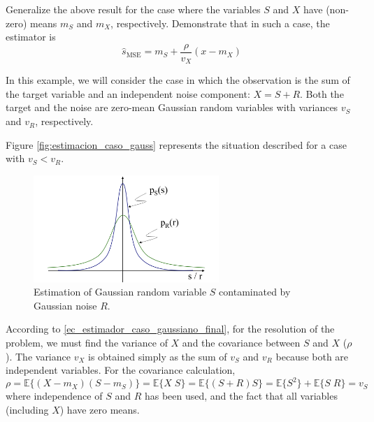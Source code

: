 \begin{exercise}
Generalize the above result for the case where the variables $S$ and $X$ have (non-zero) means $m_S$ and $m_X$, respectively. Demonstrate that in such a case, the estimator is
\begin{equation}
\hat s_{\text{MSE}} = m_S + \frac{\rho}{v_X} (x - m_X)
\end{equation}
\end{exercise}

\begin{example}
\label{ex:senialenruido}

In this example, we will consider the case in which the observation is the sum of the target variable and an independent noise component: $X = S + R$. Both the target and the noise are zero-mean Gaussian random variables with variances $v_S$ and $v_R$, respectively.

Figure \eqref{fig:estimacion_caso_gauss} represents the situation described for a case with $v_S < v_R$.
\begin{figure}[htb]
  \begin{center}
  \includegraphics[width=7cm]{Figures//estimacion_caso_gauss.png}
    \caption{Estimation of Gaussian random variable $S$ contaminated by Gaussian noise $R$.}
    \label{fig:estimacion_caso_gauss}
  \end{center}
\end{figure}

According to \eqref{ec_estimador_caso_gaussiano_final}, for the resolution of the problem, we must find the variance of $X$ and the covariance between $S$ and $X$ ($\rho$). The variance $v_X$ is obtained simply as the sum of $v_S$ and $v_R$ because both are independent variables. For the covariance calculation,
\begin{equation}
\rho = \mathbb{E} \{(X-m_X)(S-m_S)\} = \mathbb{E} \{X\;S\} = \mathbb{E} \{(S + R) S\} = \mathbb{E} \{S^2\} + \mathbb{E} \{S\;R\} = v_S
\end{equation}
where independence of $S$ and $R$ has been used, and the fact that all variables (including $X$) have zero means.


\end{example}
